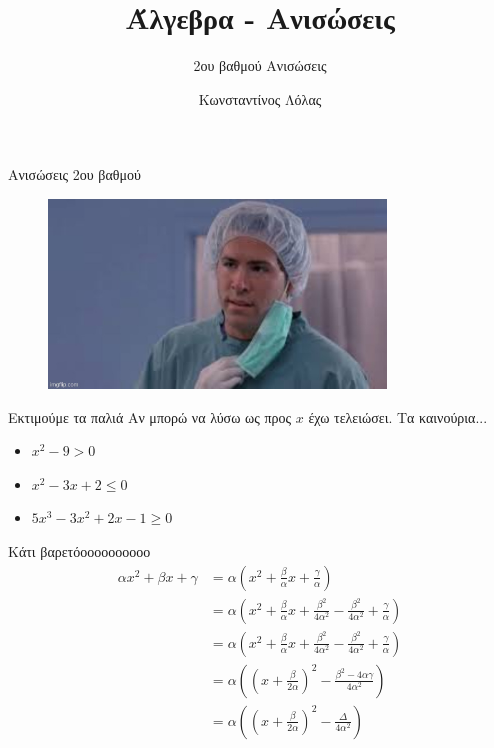 \documentclass{../../presentation}
\title{Άλγεβρα - Ανισώσεις}
\subtitle{2ου βαθμού Ανισώσεις}
\author[Λόλας]{Κωνσταντίνος Λόλας }
\date{}
\begin{document}
\frame{\titlepage}

\begin{frame}{Ανισώσεις 2ου βαθμού}

  \begin{figure}
    \centering
    \includegraphics[width=0.8\textwidth]{images/butwhy.jpg}
  \end{figure}

\end{frame}

\begin{frame}{Εκτιμούμε τα παλιά}
  Αν μπορώ να λύσω ως προς $x$ έχω τελειώσει. Τα καινούρια...
  \begin{itemize}
    \item $x^2 -9> 0$
    \item $x^2-3x+2 \le 0$
    \item $5x^3-3x^2+2x-1 \ge 0$
  \end{itemize}
\end{frame}

\begin{frame}{Κάτι βαρετόοοοοοοοοοο}
  \begin{align*}
    αx^2+βx+γ & =α(x^2+\frac{β}{α}x+\frac{γ}{α})                                                 \\
              & =α(x^2+\frac{β}{α}x+\frac{β^2}{4α^2}-\frac{β^2}{4α^2}+\frac{γ}{α})               \\
              & = α\left( x^2+\frac{β}{α}x+\frac{β^2}{4α^2}-\frac{β^2}{4α^2}+\frac{γ}{α} \right) \\
              & = α\left(\left( x+\frac{β}{2α} \right)^2 - \frac{β^2-4αγ}{4α^2}\right)           \\
              & = α\left(\left( x+\frac{β}{2α} \right)^2 - \frac{Δ}{4α^2}\right)                 \\
  \end{align*}
\end{frame}
\end{document}
